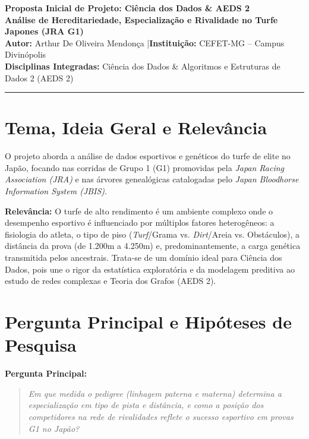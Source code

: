 \documentclass[11pt,a4paper]{article}
\begin{document}
\begin{center}
    {\Large \textbf{Proposta Inicial de Projeto: Ciência dos Dados \& AEDS 2}} \\[0.2cm]
    {\large \textbf{Análise de Hereditariedade, Especialização e Rivalidade no Turfe Japones (JRA G1)}} \\[0.15cm]
    \small \textbf{Autor:} Arthur De Oliveira Mendonça \quad|\quad \textbf{Instituição:} CEFET-MG -- Campus Divinópolis \\
    \small \textbf{Disciplinas Integradas:} Ciência dos Dados \& Algoritmos e Estruturas de Dados 2 (AEDS 2) \\[0.1cm]
    \hrule
\end{center}

\vspace{-0.2cm}

\section{Tema, Ideia Geral e Relevância}
O projeto aborda a análise de dados esportivos e genéticos do turfe de elite no Japão, focando nas corridas de Grupo 1 (G1) promovidas pela \emph{Japan Racing Association (JRA)} e nas árvores genealógicas catalogadas pelo \emph{Japan Bloodhorse Information System (JBIS)}. 

\textbf{Relevância:} O turfe de alto rendimento é um ambiente complexo onde o desempenho esportivo é influenciado por múltiplos fatores heterogêneos: a fisiologia do atleta, o tipo de piso (\emph{Turf}/Grama vs. \emph{Dirt}/Areia vs. Obstáculos), a distância da prova (de 1.200m a 4.250m) e, predominantemente, a carga genética transmitida pelos ancestrais. Trata-se de um domínio ideal para Ciência dos Dados, pois une o rigor da estatística exploratória e da modelagem preditiva ao estudo de redes complexas e Teoria dos Grafos (AEDS 2).

\section{Pergunta Principal e Hipóteses de Pesquisa}

\textbf{Pergunta Principal:}
\begin{quote}
    \itshape
    Em que medida o pedigree (linhagem paterna e materna) determina a especialização em tipo de pista e distância, e como a posição dos competidores na rede de rivalidades reflete o sucesso esportivo em provas G1 no Japão?
\end{quote}
\end{document}
